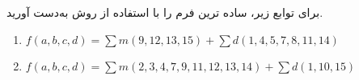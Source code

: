 برای توابع زیر، ساده ترین فرم  را با استفاده از روش  به‌دست آورید.

\begin{latin}
	\begin{enumerate}
		\item %
		$f(a,b,c,d)=\sum m(9,12,13,15) + \sum d(1,4,5,7,8,11,14)$
		
		\item %
		$f(a,b,c,d)=\sum m(2,3,4,7,9,11,12,13,14) + \sum d(1,10,15)$
	\end{enumerate} 
\end{latin}
